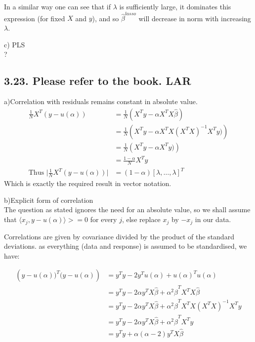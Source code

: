 In a similar way one can see that if $\lambda$ is sufficiently large, it dominates this expression (for fixed $X$ and $y$), and so $\hat{\beta}^{lasso}$ will decrease in norm with increasing $\lambda$.

c) PLS\\

?






\subsection*{3.23. Please refer to the book. LAR}
a)Correlation with residuals remains constant in absolute value.\\

\begin{align*}
    \frac{1}{N} X^T \left(y - u(\alpha)\right) &= \frac{1}{N}\left(X^T y - \alpha X^T X\hat{\beta}\right)\\
    &= \frac{1}{N}\left(X^T y - \alpha X^T X \left(X^T X\right)^{-1} X^T y)\right)\\
    &= \frac{1}{N}\left(X^T y - \alpha X^T y)\right)\\
    &= \frac{1-\alpha}{N}X^T y\\
    \text{Thus }\lvert\frac{1}{N} X^T \left(y - u(\alpha)\right) \rvert &= (1-\alpha) [\lambda,\dots,\lambda]^T
\end{align*}
Which is exactly the required result in vector notation.

b)Explicit form of correlation\\

The question as stated ignores the need for an absolute value, so we shall assume that $\langle x_j, y - u(\alpha)\rangle >= 0$ for every $j$, else replace $x_j$ by $-x_j$ in our data.

Correlations are given by covariance divided by the product of the standard deviations. as everything (data and response) is assumed to be standardised, we have:

\begin{align*}
    \left(y - u(\alpha))^T (y - u(\alpha)\right) &= 
    y^T y - 2 y^T u(\alpha) + u(\alpha)^T u(\alpha)\\
    &= y^T y - 2\alpha y^T X\hat{\beta} + \alpha^2 \hat{\beta}^T X^T X\hat{\beta}\\
    &= y^T y - 2\alpha y^T X\hat{\beta} + \alpha^2 \hat{\beta}^T X^T X \left(X^TX\right)^{-1} X^T y\\
    &= y^T y - 2\alpha y^T X\hat{\beta} + \alpha^2 \hat{\beta}^T X^T y\\
    &= y^T y + \alpha( \alpha - 2) y^T X\hat{\beta}\\
\end{align*}

